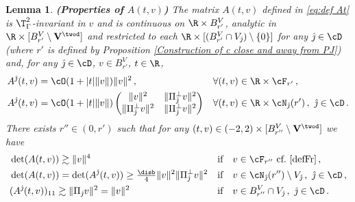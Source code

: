 \documentclass[11pt,a4paper,reqno]{article}
\numberwithin{equation}{section}
\newtheorem{lemma}[theorem]{Lemma}
\theoremstyle{definition}
\begin{document}
    \begin{lemma} {\bf (Properties of $A(t,v)$)}
    \label{Estimates on A, AQ, tilde AQ11}
        The matrix $ A(t,v) $ defined in \eqref{eq:def At} is $\T^2_\Gamma$-invariant in $v$ and is continuous on 
        $ \R \times B_{r'}^V $, analytic in $\R\times [B_{r'}^V \setminus {\bf V}^{\twod}]$ and restricted to  each $\R\times [(B_{r'}^V\cap V_{\hat \jmath})\setminus\{0\}]$   
        for any  $ {\hat \jmath}  \in \cD$ 
        (where $r'$ is defined by Proposition \ref{Construction of c close and away from PJ}) and, for any  $ {\hat \jmath}  \in \cD $, $ v \in B_{r'}^V $,
        $ t \in \R $, 
  \begin{equation}\label{AQ = cal AQ + error}
    \begin{aligned}
        & A^{\hat \jmath}(t,v) = 
            \cO(1+|t|\|v\|)\|v\|^2 \, ,  & & 
            \forall (t,v)\in \R\times \cF_{r'} \, , \\
        & A^{\hat \jmath}(t,v) = 
            \cO(1+|t|\|v\|)\begin{pmatrix}
                \|v\|^2 & \|
                \Pi_{\hat \jmath}^\bot v\|^2\\
                \| \Pi_{\hat \jmath}^\bot v \|^2 & \| \Pi_{\hat \jmath}^\bot v \|^2
            \end{pmatrix}  & & 
            \forall 
            (t,v)\in \R\times \cN_{\hat \jmath}(r')\, , \ \hat \jmath\in\cD \, .
            \end{aligned}
        \end{equation}     
     There exists $r''\in (0,r')$ such that for any $(t,v)\in (-2,2)\times [B_{r''}^V\setminus {\bf V}^{\twod}]$ we have
    \begin{equation}\label{detpospe}
        \begin{aligned}
            & \det(A(t,v)) \gtrsim \|v\|^4  & & \text{if} \quad v\in \cF_{r''}  \ \text{cf.} \  \eqref{defFr} \, ,  \\
            &\det(A(t,v))=\det(A^{\hat \jmath}(t,v)) \geq \tfrac \disb 4\|v\|^2\|\Pi_{\hat \jmath}^\bot v\|^2  & & \text{if} \quad v\in \cN_{\hat \jmath}(r'')\setminus V_{\hat \jmath}\, ,
            \   \hat \jmath \in \cD \, , \\
            &
            (A^{\hat \jmath}(t,v))_{11}\gtrsim\|\Pi_{\hat \jmath}v\|^2=\|v\|^2  & & \text{if} \quad v\in  B_{r''}^V\cap V_{\hat \jmath}\, ,
            \   \hat \jmath \in \cD\, .
        \end{aligned}
    \end{equation}
    \end{lemma}
    
\end{document}
